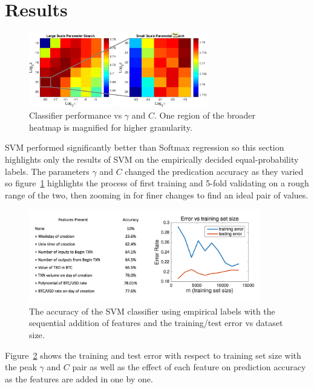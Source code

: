 \documentclass[11pt]{article}
\begin{document}
\section{Results}
\begin{figure}
\begin{center}
\includegraphics[width=0.7\textwidth]{figures/paramSearch}
\end{center}
\caption{Classifier performance vs $\gamma$ and $C$. One region of the broader heatmap is magnified for higher granularity.}
\label{paramSearch}
\end{figure}

SVM performed significantly better than Softmax regression so this section highlights only the results of SVM on the empirically decided equal-probability labels. The parameters $\gamma$ and $C$ changed the predication accuracy as they varied so figure~\ref{paramSearch} highlights the process of first training and 5-fold validating on a rough range of the two, then zooming in for finer changes to find an ideal pair of values. 

\begin{figure}
\begin{center}
\includegraphics[width=0.9\textwidth]{figures/accuracy}
\end{center}
\caption{The accuracy of the SVM classifier using empirical labels with the sequential addition of features and the training/test error vs dataset size.}
\label{accuracy}
\end{figure}

Figure~\ref{accuracy} shows the training and test error with respect to training set size with the peak $\gamma$ and $C$ pair as well as the effect of each feature on prediction accuracy as the features are added in one by one.
\end{document}
